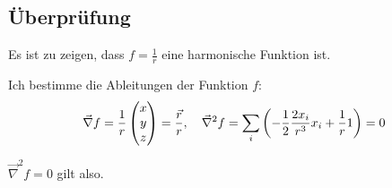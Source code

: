 \documentclass[11pt, ngerman]{article}
\newcommand{\laplace}{\vnabla^2}
\newcommand{\vnabla}{\vec \nabla}
\begin{document}
\subsection{Überprüfung}

Es ist zu zeigen, dass $f = \frac 1r$ eine harmonische Funktion ist.

Ich bestimme die Ableitungen der Funktion $f$:
\[
	\vnabla f = \frac{1}{r} \begin{pmatrix}
		x \\ y \\ z
	\end{pmatrix} = \frac{\vec r}{r}
	,\quad
	\laplace f = \sum_i \del{- \frac12 \frac{2x_i}{r^3} x_i + \frac 1r 1} = 0
\]

$\laplace f = 0$ gilt also.
\end{document}
